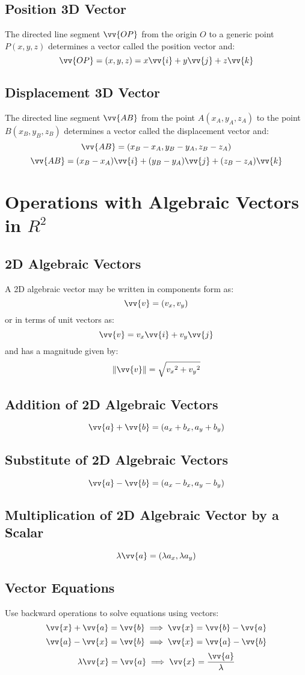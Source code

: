 		\subsection{Position 3D Vector}
			The directed line segment $\vv{OP}$ from the origin $O$ to a generic point $P(x, y, z)$ determines a vector called the position vector and:
			\[\vv{OP} = (x, y, z) = x\vv{i} + y\vv{j} + z\vv{k}\]
		\subsection{Displacement 3D Vector}
			The directed line segment $\vv{AB}$ from the point $A(x_A, y_A, z_A)$ to the point $B(x_B, y_B, z_B)$ determines a vector called the displacement vector and:
			\[\vv{AB} = (x_B - x_A, y_B - y_A, z_B - z_A)\]
			\[\vv{AB} = (x_B - x_A)\vv{i} + (y_B - y_A)\vv{j} + (z_B - z_A)\vv{k}\]
	\section{Operations with Algebraic Vectors in $R^2$}
		\subsection{2D Algebraic Vectors}
			A 2D algebraic vector may be written in components form as:
			\[\vv{v} = (v_x, v_y)\]
			or in terms of unit vectors as:
			\[\vv{v} = v_x\vv{i} + v_y\vv{j}\]
			and has a magnitude given by:
			\[\|\vv{v}\| = \sqrt{{v_x}^2 + {v_y}^2}\]
		\subsection{Addition of 2D Algebraic Vectors}
			\[\vv{a} + \vv{b} = (a_x + b_x, a_y + b_y)\]
		\subsection{Substitute of 2D Algebraic Vectors}
			\[\vv{a} - \vv{b} = (a_x - b_x, a_y - b_y)\]
		\subsection{Multiplication of 2D Algebraic Vector by a Scalar}
			\[\lambda\vv{a} = (\lambda a_x, \lambda a_y)\]
		\subsection{Vector Equations}
			Use backward operations to solve equations using vectors:
			\[\vv{x} + \vv{a} = \vv{b} \implies \vv{x} = \vv{b} - \vv{a}\]
			\[\vv{a} - \vv{x} = \vv{b} \implies \vv{x} = \vv{a} - \vv{b}\]
			\[\lambda\vv{x} = \vv{a} \implies \vv{x} = \frac{\vv{a}}{\lambda}\]
